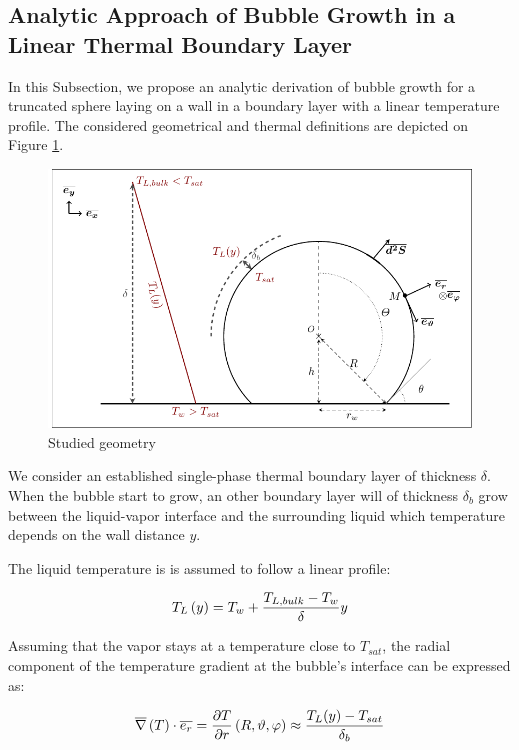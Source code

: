\subsection{Analytic Approach of Bubble Growth in a Linear Thermal Boundary Layer}

In this Subsection, we propose an analytic derivation of bubble growth for a truncated sphere laying on a wall in a boundary layer with a linear temperature profile. The considered geometrical and thermal definitions are depicted on Figure \ref{fig:anal_growth}.


\begin{figure}[h!]
\centering
\includegraphics[width=0.7\linewidth]{img/growth/growth_analytical.pdf}
\caption{Studied geometry}
\label{fig:anal_growth}
\end{figure}

We consider an established single-phase thermal boundary layer of thickness $\delta$. When the bubble start to grow, an other boundary layer will of thickness $\delta_{b}$ grow between the liquid-vapor interface and the surrounding liquid which temperature depends on the wall distance $y$.


\npar


The liquid temperature is is assumed to follow a linear profile:

\begin{align}
T_{L}\left( y \right)=T_{w}+\frac{T_{L,bulk}-T_{w}}{\delta} y
\end{align}


Assuming that the vapor stays at a temperature close to $T_{sat}$, the radial component of the temperature gradient at the bubble's interface can be expressed as:

\begin{align}
\overline{\nabla}\left({T}\right) \cdot \overline{e_{r}} = \frac{\partial T}{\partial r}\left( R, \vartheta, \varphi \right) \approx\frac{T_{L}(y)-T_{sat}}{\delta_{b}}
\end{align}

